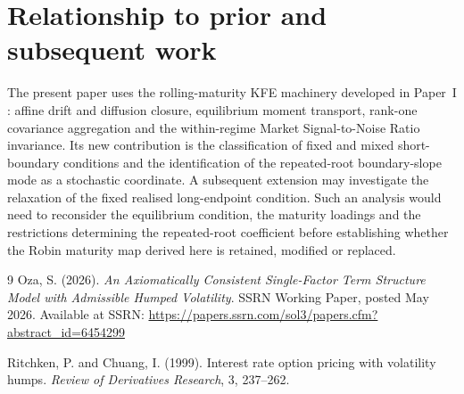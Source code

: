 \documentclass[12pt]{article}
\numberwithin{equation}{subsection}
\begin{document}
\section*{Relationship to prior and subsequent work}
The present paper uses the rolling-maturity KFE machinery developed in Paper~I \cite{Oza2026}: affine drift and diffusion closure, equilibrium moment transport, rank-one covariance aggregation and the within-regime Market Signal-to-Noise Ratio invariance. Its new contribution is the classification of fixed and mixed short-boundary conditions and the identification of the repeated-root boundary-slope mode as a stochastic coordinate. A subsequent extension may investigate the relaxation of the fixed realised long-endpoint condition. Such an analysis would need to reconsider the equilibrium condition, the maturity loadings and the restrictions determining the repeated-root coefficient before establishing whether the Robin maturity map derived here is retained, modified or replaced.

\begin{thebibliography}{9}
Oza, S. (2026).
\newblock \emph{An Axiomatically Consistent Single-Factor Term Structure Model with Admissible Humped Volatility}.
SSRN Working Paper, posted May 2026.
Available at SSRN: \url{https://papers.ssrn.com/sol3/papers.cfm?abstract_id=6454299}

Ritchken, P. and Chuang, I. (1999).
\newblock Interest rate option pricing with volatility humps.
\newblock \emph{Review of Derivatives Research}, 3, 237--262.

\end{thebibliography}
\end{document}
